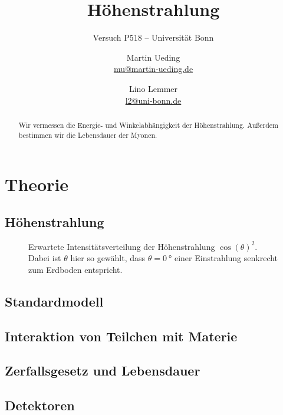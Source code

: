 \documentclass[11pt, ngerman, fleqn, DIV=15, headinclude, BCOR=2cm]{scrreprt}
\title{Höhenstrahlung}
\subtitle{Versuch P518 -- Universität Bonn}
\author{
    Martin Ueding \\ \small{\href{mailto:mu@martin-ueding.de}{mu@martin-ueding.de}}
    \and
    Lino Lemmer \\
    \small{\href{mailto:l2@uni-bonn.de}{l2@uni-bonn.de}}
}
\date{\daterange{2014-07-02}{2014-07-03}}
\begin{document}
\maketitle

\begin{abstract}
    Wir vermessen die Energie- und Winkelabhängigkeit der Höhenstrahlung.
    Außerdem bestimmen wir die Lebensdauer der Myonen.
\end{abstract}

\tableofcontents

\chapter{Theorie}

\section{Höhenstrahlung}

\begin{figure}[htbp]
    \centering
    \caption{%
        Erwartete Intensitätsverteilung der Höhenstrahlung $\cos(\theta)^2$.
        Dabei ist $\theta$ hier so gewählt, dass $\theta = \SI{0}{\degree}$
        einer Einstrahlung senkrecht zum Erdboden entspricht.
    }
    \label{fig:cos2}
\end{figure}

\section{Standardmodell}

\section{Interaktion von Teilchen mit Materie}

\section{Zerfallsgesetz und Lebensdauer}

\section{Detektoren}
\end{document}
